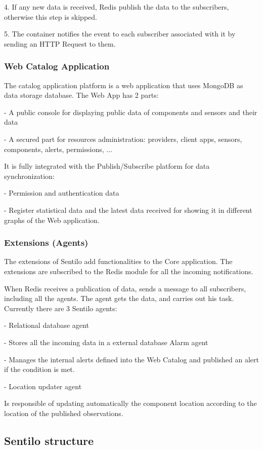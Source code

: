 4. If any new data is received,
	Redis publish the data to the subscribers,
	otherwise this step is skipped.

5. The container notifies the event to each subscriber associated with it by sending an HTTP Request to them.


\subsubsection{Web Catalog Application}

The catalog application platform is a web application that uses MongoDB as data
storage database.
The Web App has 2 parts:

- A public console for displaying public data of components and sensors and
their data

- A secured part for resources administration: providers, client apps, sensors,
components, alerts, permissions, ...

It is fully integrated with the Publish/Subscribe platform for data synchronization:

- Permission and authentication data

- Register statistical data and the latest data received for showing it in different
graphs of the Web application.

\subsubsection{Extensions (Agents)}

The extensions of Sentilo add functionalities to the Core application.
The extensions are subscribed to the Redis module for all the incoming notifications.

When Redis receives a publication of data, sends a message to all subscribers,
including all the agents.
The agent gets the data, and carries out his task.
Currently there are 3 Sentilo agents:

- Relational database agent

- Stores all the incoming data in a external database
Alarm agent

- Manages the internal alerts defined into the Web Catalog and published an
alert if the condition is met.

- Location updater agent

Is responsible of updating automatically the component location according
to the location of the published observations.

\subsection{Sentilo structure}

